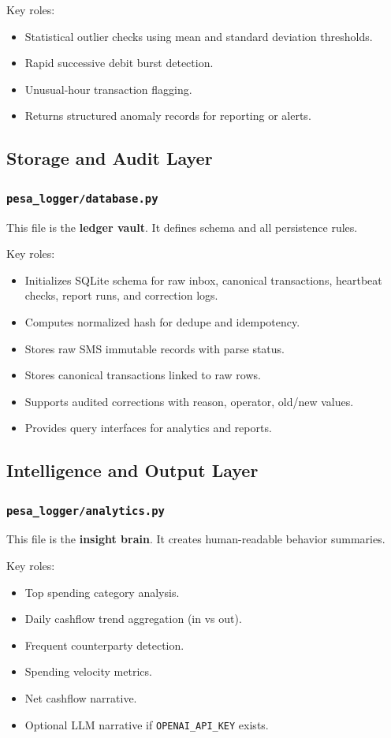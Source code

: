 \documentclass[12pt,a4paper]{article}
\begin{document}
Key roles:
\begin{itemize}[leftmargin=1.5em]
  \item Statistical outlier checks using mean and standard deviation thresholds.
  \item Rapid successive debit burst detection.
  \item Unusual-hour transaction flagging.
  \item Returns structured anomaly records for reporting or alerts.
\end{itemize}

\subsection{Storage and Audit Layer}
\subsubsection*{\texttt{pesa\_logger/database.py}}
This file is the \textbf{ledger vault}. It defines schema and all persistence rules.

Key roles:
\begin{itemize}[leftmargin=1.5em]
  \item Initializes SQLite schema for raw inbox, canonical transactions, heartbeat checks, report runs, and correction logs.
  \item Computes normalized hash for dedupe and idempotency.
  \item Stores raw SMS immutable records with parse status.
  \item Stores canonical transactions linked to raw rows.
  \item Supports audited corrections with reason, operator, old/new values.
  \item Provides query interfaces for analytics and reports.
\end{itemize}

\subsection{Intelligence and Output Layer}
\subsubsection*{\texttt{pesa\_logger/analytics.py}}
This file is the \textbf{insight brain}. It creates human-readable behavior summaries.

Key roles:
\begin{itemize}[leftmargin=1.5em]
  \item Top spending category analysis.
  \item Daily cashflow trend aggregation (in vs out).
  \item Frequent counterparty detection.
  \item Spending velocity metrics.
  \item Net cashflow narrative.
  \item Optional LLM narrative if \texttt{OPENAI\_API\_KEY} exists.
\end{itemize}
\end{document}
